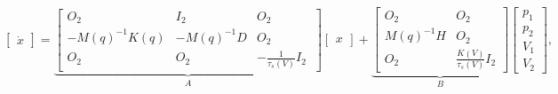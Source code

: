 \begin{equation}
     \begin{bmatrix} \dot{x}  \end{bmatrix}   =   \underbrace{ \begin{bmatrix} O_2 & I_2 & O_2 \\ -M(q)^{-1}K(q)  & -M(q)^{-1} D & O_2 \\
     O_2 & O_2    & -\frac{1}{\tau_s(V)}I_2\ \end{bmatrix}   }_A   \begin{bmatrix} x \end{bmatrix}  + \underbrace{      \begin{bmatrix} O_2 & O_2 \\ M(q)^{-1}H & O_2 \\ O_2 & \frac{K(V)}{\tau_s(V)} I_2 \end{bmatrix} }_B      \begin{bmatrix} p_1 \\ p_2  \\ V_1 \\ V_2 \end{bmatrix},
     \label{eq:ssp}
\end{equation}








